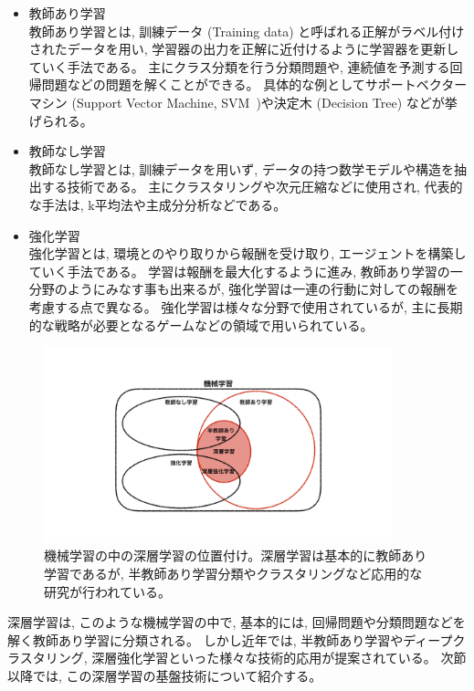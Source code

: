\begin{itemize}
  \item 教師あり学習\\
  教師あり学習とは, 訓練データ (Training data) と呼ばれる正解がラベル付けされたデータを用い, 学習器の出力を正解に近付けるように学習器を更新していく手法である。
  主にクラス分類を行う分類問題や, 連続値を予測する回帰問題などの問題を解くことができる。
  具体的な例としてサポートベクターマシン (Support Vector Machine, SVM~\cite{PatternRecognitionUsingGeneralizedPortraitMethod,TrainingAlgorithmforOptimalMarginClassifiers})や決定木 (Decision Tree) などが挙げられる。
  \item 教師なし学習\\
  教師なし学習とは, 訓練データを用いず, データの持つ数学モデルや構造を抽出する技術である。
  主にクラスタリングや次元圧縮などに使用され, 代表的な手法は, k平均法や主成分分析などである。
  \item 強化学習\\
  強化学習とは, 環境とのやり取りから報酬を受け取り, エージェントを構築していく手法である。
  学習は報酬を最大化するように進み, 教師あり学習の一分野のようにみなす事も出来るが, 強化学習は一連の行動に対しての報酬を考慮する点で異なる。
  強化学習は様々な分野で使用されているが, 主に長期的な戦略が必要となるゲームなどの領域で用いられている。
\end{itemize}

\begin{figure}[htbp]
 \centering
 \includegraphics[trim = 0 100 0 50, width=0.9\textwidth, clip]{Figure/2DeepLearning/1MachineLearning.png}
 \caption[機械学習の中の深層学習の位置付け]{機械学習の中の深層学習の位置付け。深層学習は基本的に教師あり学習であるが, 半教師あり学習分類やクラスタリングなど応用的な研究が行われている。}
 \label{1MachineLearning}
\end{figure}

深層学習は, このような機械学習の中で, 基本的には, 回帰問題や分類問題などを解く教師あり学習に分類される。
しかし近年では, 半教師あり学習やディープクラスタリング, 深層強化学習といった様々な技術的応用が提案されている。
次節以降では, この深層学習の基盤技術について紹介する。


